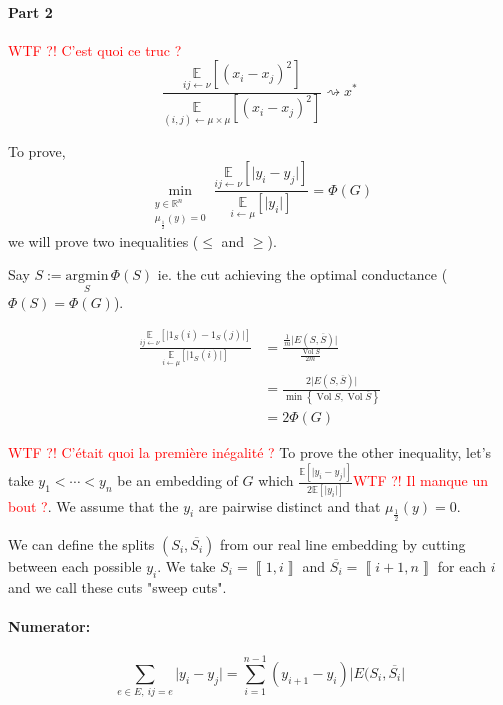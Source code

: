 \documentclass[12pt]{article}
\newcommand{\EE}{\mathbb{E}}
\newcommand{\RR}{\mathbb{R}}
\newcommand{\set}[1]{\left\{ #1 \right\}}
\newcommand{\brackets}[1]{\left\llbracket #1 \right\rrbracket}
\newcommand{\wtf}[1]{\Huge\textcolor{red}{WTF ?! #1}\normalsize}
\newcommand{\argmin}{\text{argmin}}
\newcommand{\la}{\leftarrow}
\newcommand{\esp}[2][]{\underset{#1}{\EE}\left[ #2 \right]}
\DeclareMathOperator{\vol}{Vol}
\begin{document}
\paragraph{Part 2}
\wtf{C'est quoi ce truc ?}
\[
    \frac{\esp[ij\la\nu]{(x_i-x_j)^2}}{\esp[(i,j)\la\mu\times\mu]{(x_i-x_j)^2}} \rightsquigarrow x^*
\]



To prove,
\[
    \min\limits_{\substack{y\in\RR^n\\\mu_{\frac{1}{2}}(y)=0}} \frac{\esp[ij\la\nu]{\lvert y_i-y_j\rvert}}{\esp[i\la\mu]{\lvert y_i \rvert}} = \Phi(G)
\]
we will prove two inequalities ($\leqslant$ and $\geqslant$).

\bigskip

Say $S:=\underset{S}{\argmin}\,\Phi(S)$ ie. the cut achieving the optimal conductance ($\Phi(S) = \Phi(G)$).

\[
    \begin{aligned}
        \frac{\esp[ij\la\nu]{\lvert1_S(i)-1_S(j)\rvert}}{\esp[i\la\mu]{\lvert 1_S(i)\rvert}} &= \frac{\frac{1}{m}\lvert E(S,\overline{S})\rvert}{\frac{\vol S}{2m}}\\
        &= \frac{2\lvert E(S,\overline{S}) \rvert}{\min\set{\vol S, \vol \overline{S}}}\\
        &= 2 \Phi(G)
    \end{aligned}
\]

\bigskip

\wtf{C'était quoi la première inégalité ?}
To prove the other inequality, let's take $y_1 < \cdots < y_n$ be an embedding of $G$ which $\frac{\esp{\lvert y_i-y_j\rvert}}{2\esp{\lvert y_i \rvert}}$\wtf{Il manque un bout ?}. We assume that the $y_i$ are pairwise distinct and that $\mu_{\frac{1}{2}}(y) = 0$.


    We can define the splits $(S_i, \overline{S_i})$ from our real line embedding by cutting between each possible $y_i$. We take $S_i = \brackets{1,i}$ and $\overline{S_i} = \brackets{i+1,n}$ for each $i$ and we call these cuts "sweep cuts".


\paragraph{Numerator:}

\[
    \sum\limits_{e\in E,\ ij=e} \lvert y_i-y_j \rvert = \sum\limits_{i=1}^{n-1} (y_{i+1} - y_i) \lvert E(S_i, \overline{S_i} \rvert
\]
\end{document}
